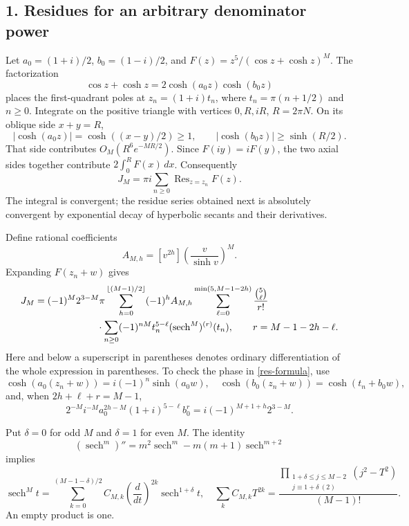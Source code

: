 \documentclass[11pt]{article}
\newcommand{\sech}{\operatorname{sech}}
\newcommand{\Res}{\operatorname{Res}}
\begin{document}
\subsection*{1. Residues for an arbitrary denominator power}
Let $a_0=(1+i)/2$, $b_0=(1-i)/2$, and
$F(z)=z^5/(\cos z+\cosh z)^M$.
The factorization
\[
 \cos z+\cosh z=2\cosh(a_0z)\cosh(b_0z)
\]
places the first-quadrant poles at $z_n=(1+i)t_n$, where
$t_n=\pi(n+1/2)$ and $n\ge0$. Integrate on the positive triangle
with vertices $0,R,iR$, $R=2\pi N$. On its oblique side $x+y=R$,
\[
 |\cosh(a_0z)|=\cosh((x-y)/2)\ge1,\qquad
 |\cosh(b_0z)|\ge\sinh(R/2).
\]
That side contributes $O_M(R^6e^{-MR/2})$. Since $F(iy)=iF(y)$,
the two axial sides together contribute $2\int_0^R F(x)\,dx$.
Consequently
\begin{equation}\label{res-sum}
 J_M=\pi i\sum_{n\ge0}\Res_{z=z_n}F(z).
\end{equation}
The integral is convergent; the residue series obtained next is
absolutely convergent by exponential decay of hyperbolic secants
and their derivatives.

Define rational coefficients
\[
 A_{M,h}=[v^{2h}]\left(\frac{v}{\sinh v}\right)^M.
\]
Expanding $F(z_n+w)$ gives
\begin{equation}\label{res-formula}
 \begin{aligned}
 J_M={}&(-1)^M2^{3-M}\pi
 \sum_{h=0}^{\lfloor(M-1)/2\rfloor}(-1)^h A_{M,h}
 \sum_{\ell=0}^{\min(5,M-1-2h)}\frac{\binom5\ell}{r!}\\
 &\hspace{18mm}\cdot\sum_{n\ge0}(-1)^{nM}t_n^{5-\ell}
                (\sech^M)^{(r)}(t_n),
 \qquad r=M-1-2h-\ell.
 \end{aligned}
\end{equation}
Here and below a superscript in parentheses denotes ordinary
differentiation of the whole expression in parentheses. To check the phase in
\eqref{res-formula}, use
\[
 \cosh(a_0(z_n+w))=i(-1)^n\sinh(a_0w),\quad
 \cosh(b_0(z_n+w))=\cosh(t_n+b_0w),
\]
and, when $2h+\ell+r=M-1$,
\[
 2^{-M}i^{-M}a_0^{2h-M}(1+i)^{5-\ell}b_0^r
       =i(-1)^{M+1+h}2^{3-M}.
\]

Put $\delta=0$ for odd $M$ and $\delta=1$ for even $M$.
The identity
\[
 (\sech^m)''=m^2\sech^m-m(m+1)\sech^{m+2}
\]
implies
\begin{equation}\label{hyperbolic}
 \sech^M t=\sum_{k=0}^{(M-1-\delta)/2}C_{M,k}
       \left(\frac{d}{dt}\right)^{2k}\sech^{1+\delta}t,
 \quad
 \sum_k C_{M,k}T^{2k}
 =\frac{\prod_{\substack{1+\delta\le j\le M-2\\j\equiv1+\delta\ (2)}}
                    (j^2-T^2)}{(M-1)!}.
\end{equation}
An empty product is one.
\end{document}
